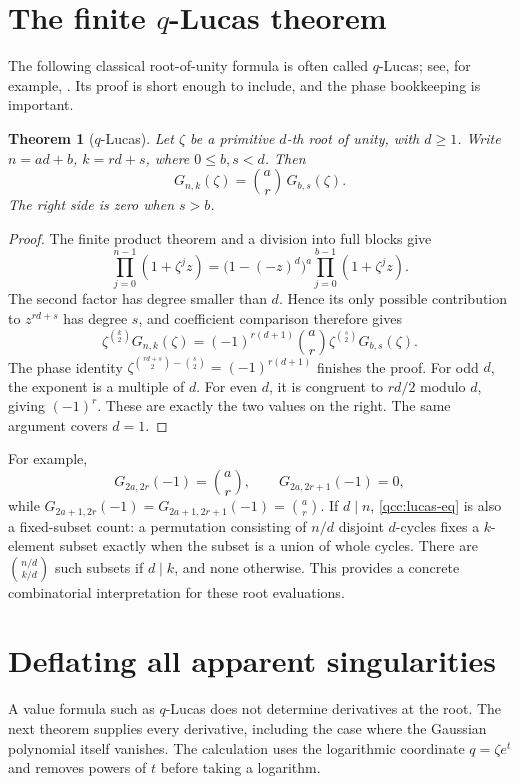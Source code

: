 \documentclass[11pt,a4paper,oneside,openany]{book}
\newtheorem{theorem}{Theorem}[chapter]
\theoremstyle{definition}
\theoremstyle{remark}
\newcommand{\qbname}{\texorpdfstring{$q$}{q}}
\begin{document}
\section{The finite \qbname-Lucas theorem}
The following classical root-of-unity formula is often called \(q\)-Lucas;
see, for example, \cite{formichella-straub}. Its proof is short enough to
include, and the phase bookkeeping is important.

\begin{theorem}[\(q\)-Lucas]\label{qcc:lucas}
Let \(\zeta\) be a primitive \(d\)-th root of unity, with \(d\ge1\).
Write \(n=ad+b\), \(k=rd+s\), where \(0\le b,s<d\). Then
\begin{equation}\label{qcc:lucas-eq}
 G_{n,k}(\zeta)=\binom ar\,G_{b,s}(\zeta).
\end{equation}
The right side is zero when \(s>b\).
\end{theorem}
\begin{proof}
The finite product theorem and a division into full blocks give
\[
 \prod_{j=0}^{n-1}(1+\zeta^jz)
 =\bigl(1-(-z)^d\bigr)^a
       \prod_{j=0}^{b-1}(1+\zeta^jz).
\]
The second factor has degree smaller than \(d\). Hence its only possible
contribution to \(z^{rd+s}\) has degree \(s\), and coefficient comparison
therefore gives
\[
 \zeta^{\binom k2}G_{n,k}(\zeta)
 =(-1)^{r(d+1)}\binom ar
           \zeta^{\binom s2}G_{b,s}(\zeta).
\]
The phase identity
\(\zeta^{\binom{rd+s}{2}-\binom s2}=(-1)^{r(d+1)}\)
finishes the proof. For odd \(d\), the exponent is a multiple of \(d\).
For even \(d\), it is congruent to \(rd/2\) modulo \(d\), giving
\((-1)^r\). These are exactly the two values on the right.
The same argument covers \(d=1\).
\end{proof}

For example,
\[
 G_{2a,2r}(-1)=\binom ar,\qquad G_{2a,2r+1}(-1)=0,
\]
while \(G_{2a+1,2r}(-1)=G_{2a+1,2r+1}(-1)=\binom ar\).
If \(d\mid n\), \eqref{qcc:lucas-eq} is also a fixed-subset count: a
permutation consisting of \(n/d\) disjoint \(d\)-cycles fixes a
\(k\)-element subset exactly when the subset is a union of whole cycles.
There are \(\binom{n/d}{k/d}\) such subsets if \(d\mid k\), and none
otherwise. This provides a concrete combinatorial interpretation for these
root evaluations.

\section{Deflating all apparent singularities}
A value formula such as \(q\)-Lucas does not determine derivatives at the
root. The next theorem supplies every derivative, including the case where the
Gaussian polynomial itself vanishes. The calculation uses the logarithmic
coordinate \(q=\zeta e^t\) and removes powers of \(t\) before taking a
logarithm.
\end{document}
